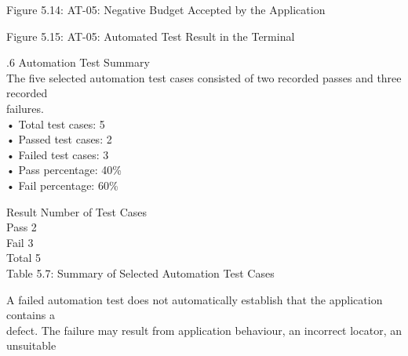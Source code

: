 \documentclass[12pt,a4paper]{report}
\begin{document}
\smallskip

\smallskip

\smallskip

\smallskip
Figure 5.14: AT-05: Negative Budget Accepted by the Application\\ 

\smallskip

\smallskip

\smallskip

\smallskip
Figure 5.15: AT-05: Automated Test Result in the Terminal\\ 

\smallskip

\smallskip

.6 Automation Test Summary\\ 

\smallskip
The five selected automation test cases consisted of two recorded passes and three recorded\\ 
failures.\\ 

\smallskip
• Total test cases: 5\\ 

\smallskip
• Passed test cases: 2\\ 

\smallskip
• Failed test cases: 3\\ 

\smallskip
• Pass percentage: 40\%\\ 

\smallskip
• Fail percentage: 60\%\\ 

\smallskip

\smallskip
Result Number of Test Cases\\ 

\smallskip
Pass                2\\ 

\smallskip
Fail                3\\ 

\smallskip
Total               5\\ 

\smallskip
Table 5.7: Summary of Selected Automation Test Cases\\ 

\smallskip

\smallskip
A failed automation test does not automatically establish that the application contains a\\ 
defect. The failure may result from application behaviour, an incorrect locator, an unsuitable\\ 
\end{document}
